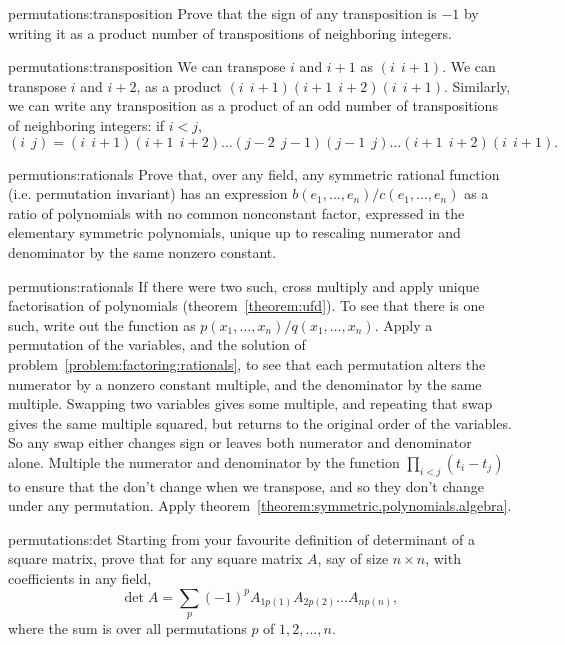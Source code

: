 \begin{problem}{permutations:transposition}
Prove that the sign of any transposition is \(-1\) by writing it as a product number of transpositions of neighboring integers.
\end{problem}
\begin{answer}{permutations:transposition}
We can transpose \(i\) and \(i+1\) as \((i \ \ i+1)\).
We can transpose \(i\) and \(i+2\), as a product \((i \ \ i+1)(i+1 \ \ i+2)(i \ \ i+1)\).
Similarly, we can write any transposition as a product of an odd number of transpositions of neighboring integers: if \(i<j\),
\[
(i \ \ j)=(i \ \ i+1)(i+1 \ \ i+2)\dots(j-2 \ \ j-1)(j-1 \ \ j)\dots(i+1 \ \ i+2)(i \ \ i+1).
\]
\end{answer}
\begin{problem}{permutions:rationals}
Prove that, over any field, any symmetric rational function (i.e. permutation invariant) has an expression \(b(e_1,\dots,e_n)/c(e_1,\dots,e_n)\) as a ratio of polynomials with no common nonconstant factor, expressed in the elementary symmetric polynomials, unique up to rescaling numerator and denominator by the same nonzero constant.
\end{problem}
\begin{answer}{permutions:rationals}
If there were two such, cross multiply and apply unique factorisation of polynomials (theorem~\vref{theorem:ufd}).
To see that there is one such, write out the function as \(p(x_1,\dots,x_n)/q(x_1,\dots,x_n)\).
Apply a permutation of the variables, and the solution of problem~\vref{problem:factoring:rationals}, to see that each permutation alters the numerator by a nonzero constant multiple, and the denominator by the same multiple.
Swapping two variables gives some multiple, and repeating that swap gives the same multiple squared, but returns to the original order of the variables.
So any swap either changes sign or leaves both numerator and denominator alone.
Multiple the numerator and denominator by the function \(\prod_{i<j}(t_i - t_j)\) to ensure that the don't change when we transpose, and so they don't change under any permutation.
Apply theorem~\vref{theorem:symmetric.polynomials.algebra}.
\end{answer}
\begin{problem}{permutations:det}
Starting from your favourite definition of determinant of a square matrix, prove that for any square matrix \(A\), say of size \(n \times n\), with coefficients in any field,
\[
\det A = \sum_p (-1)^p A_{1p(1)}A_{2p(2)} \dots A_{np(n)},
\]
where the sum is over all permutations \(p\) of \(1,2,\dots,n\).
\end{problem}

